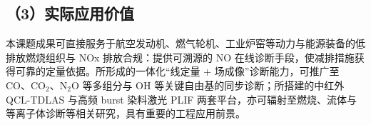 \subsection{（3）实际应用价值}

本课题成果可直接服务于航空发动机、燃气轮机、工业炉窑等动力与能源装备的低排放燃烧组织与 NOx 排放合规：提供可溯源的 NO 在线诊断手段，使减排措施获得可靠的定量依据。所形成的一体化``线定量 + 场成像''诊断能力，可推广至 CO、CO$_2$、N$_2$O 等多组分与 OH 等关键自由基的同步诊断；所搭建的中红外 QCL-TDLAS 与高频 burst 染料激光 PLIF 两套平台，亦可辐射至燃烧、流体与等离子体诊断等相关研究，具有重要的工程应用前景。
